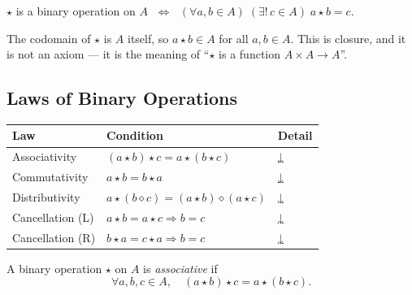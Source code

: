 \begin{remark}
$\star$ is a binary operation on $A$
$\;\iff\;$
$(\forall a, b \in A)\;(\exists!\, c \in A)\; a \star b = c$.
\end{remark}

\begin{remark}
The codomain of $\star$ is $A$ itself, so $a \star b \in A$ for all
$a, b \in A$.
This is closure, and it is not an axiom — it is the meaning of
``$\star$ is a function $A \times A \to A$''.
\end{remark}


\subsection{Laws of Binary Operations}

\begin{tcolorbox}[colback=gray!6, colframe=gray!40, arc=2pt,
  left=6pt, right=6pt, top=4pt, bottom=4pt,
  title={\small\textbf{Laws of Binary Operations — Quick Reference}},
  fonttitle=\small\bfseries]
\small
\begin{tabular}{l l l}
\toprule
\textbf{Law} & \textbf{Condition} & \textbf{Detail} \\
\midrule
Associativity    & $(a \star b) \star c = a \star (b \star c)$         & \hyperref[def:associativity]{↓} \\
Commutativity    & $a \star b = b \star a$                             & \hyperref[def:commutativity]{↓} \\
Distributivity   & $a \star (b \diamond c) = (a \star b) \diamond (a \star c)$ & \hyperref[def:distributivity]{↓} \\
Cancellation (L) & $a \star b = a \star c \Rightarrow b = c$           & \hyperref[def:cancellation]{↓} \\
Cancellation (R) & $b \star a = c \star a \Rightarrow b = c$           & \hyperref[def:cancellation]{↓} \\
\bottomrule
\end{tabular}
\end{tcolorbox}

\vspace{1em}

\begin{tcolorbox}[colback=propbox, colframe=propborder, arc=2pt,
  left=6pt, right=6pt, top=4pt, bottom=4pt,
  title={\small\textbf{Definition (Associativity)}},
  fonttitle=\small\bfseries]
\label{def:associativity}
A binary operation $\star$ on $A$ is \emph{associative} if
\[
  \forall a, b, c \in A,\quad (a \star b) \star c = a \star (b \star c).
\]
\end{tcolorbox}

